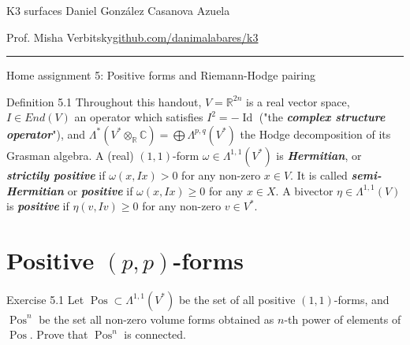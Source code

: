 

\usepackage[style=authortitle-terse,backend=bibtex]{biblatex}


\setcounter{secnumdepth}{0}



\begin{minipage}{\textwidth}
	\begin{minipage}{1\textwidth}
		K3 surfaces \hfill Daniel González Casanova Azuela
		
		{\small Prof. Misha Verbitsky\hfill\href{https://github.com/danimalabares/k3}{github.com/danimalabares/k3}}
	\end{minipage}
\end{minipage}\vspace{.2cm}\hrule

\vspace{10pt}
{\huge Home assignment 5: Positive forms and Riemann-Hodge pairing}

\begin{idea4}{Definition 5.1}\leavevmode
	Throughout this handout, $V=\mathbb{R}^{2n}$ is a real vector space, $I\in End(V)$ an operator which satisfies $I^2=-\operatorname{Id}$ ("the \textit{\textbf{complex structure operator}}"), and $\Lambda^{*}(V^*\otimes_\mathbb{R}\mathbb{C}) =\bigoplus \Lambda^{p,q}(V^*) $ the Hodge decomposition of its Grasman algebra. A (real) $(1,1)$-form $ \omega\in\Lambda^{1,1}(V^*)$ is \textit{\textbf{Hermitian}}, or \textit{\textbf{strictily positive}} if $\omega(x,Ix)>0$ for any non-zero  $x\in V$. It is called \textit{\textbf{semi-Hermitian}} or  \textit{\textbf{positive}} if  $\omega(x,Ix)\geq 0$ for any $x\in X$. A bivector $\eta\in\Lambda^{1,1}(V)$ is \textit{\textbf{positive}} if $\eta(v,Iv)\geq 0$ for any non-zero $v\in V^*$.
\end{idea4}

\section{Positive $(p,p)$-forms}

\begin{idea13}{Exercise 5.1}\leavevmode
	Let $\operatorname{Pos}\subset \Lambda^{1,1}(V^*)$ be the set of all positive $(1,1)$-forms, and $\operatorname{Pos}^n$ be the set all non-zero volume forms obtained as $n$-th power of elements of $\operatorname{Pos}$. Prove that $\operatorname{Pos}^n$ is connected.
\end{idea13}

